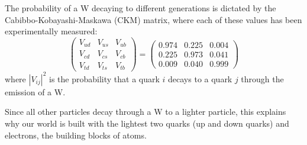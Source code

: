 The probability of a W decaying to different generations is dictated by the Cabibbo-Kobayashi-Maskawa (CKM) matrix, where each of these values has been experimentally measured:
\begin{equation}\label{Eq:CKM}
    \left(\begin{array}{c} V_{ud}\\V_{cd}\\V_{td} \end{array}\begin{array}{c}  V_{us}\\V_{cs}\\V_{ts} \end{array}\begin{array}{c} V_{ub}\\V_{cb}\\V_{tb}  \end{array}\right) = \left(\begin{array}{c} 0.974\\0.225\\0.009 \end{array}\begin{array}{c}  0.225\\0.973\\0.040 \end{array}\begin{array}{c} 0.004\\0.041\\0.999  \end{array}\right)
\end{equation}
where $|V_{ij}|^2$ is the probability that a quark $i$ decays to a quark $j$ through the emission of a W.

Since all other particles decay through a W to a lighter particle, this explains why our world is built with the lightest two quarks (up and down quarks) and electrons, the building blocks of atoms. 

